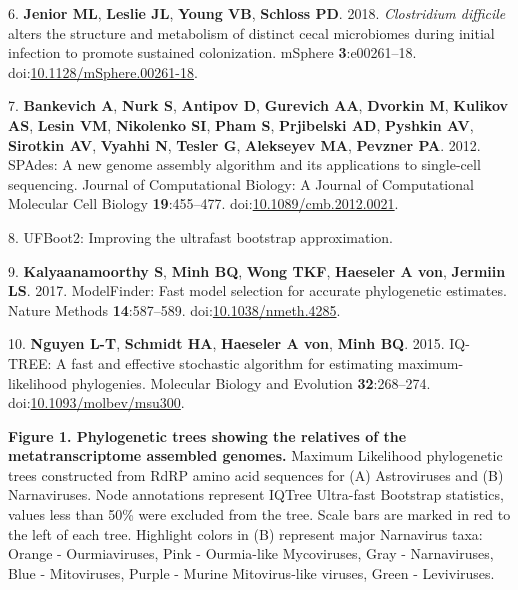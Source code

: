 \documentclass[11pt,]{article}
\begin{document}
\leavevmode\hypertarget{ref-jenior_clostridium_2018}{}%
6. \textbf{Jenior ML}, \textbf{Leslie JL}, \textbf{Young VB},
\textbf{Schloss PD}. 2018. \emph{Clostridium difficile} alters the
structure and metabolism of distinct cecal microbiomes during initial
infection to promote sustained colonization. mSphere
\textbf{3}:e00261--18.
doi:\href{https://doi.org/10.1128/mSphere.00261-18}{10.1128/mSphere.00261-18}.

\leavevmode\hypertarget{ref-bankevich_spades:_2012}{}%
7. \textbf{Bankevich A}, \textbf{Nurk S}, \textbf{Antipov D},
\textbf{Gurevich AA}, \textbf{Dvorkin M}, \textbf{Kulikov AS},
\textbf{Lesin VM}, \textbf{Nikolenko SI}, \textbf{Pham S},
\textbf{Prjibelski AD}, \textbf{Pyshkin AV}, \textbf{Sirotkin AV},
\textbf{Vyahhi N}, \textbf{Tesler G}, \textbf{Alekseyev MA},
\textbf{Pevzner PA}. 2012. SPAdes: A new genome assembly algorithm and
its applications to single-cell sequencing. Journal of Computational
Biology: A Journal of Computational Molecular Cell Biology
\textbf{19}:455--477.
doi:\href{https://doi.org/10.1089/cmb.2012.0021}{10.1089/cmb.2012.0021}.

\leavevmode\hypertarget{ref-hoang_ufboot2:_2018}{}%
8. UFBoot2: Improving the ultrafast bootstrap approximation.

\leavevmode\hypertarget{ref-kalyaanamoorthy_modelfinder:_2017}{}%
9. \textbf{Kalyaanamoorthy S}, \textbf{Minh BQ}, \textbf{Wong TKF},
\textbf{Haeseler A von}, \textbf{Jermiin LS}. 2017. ModelFinder: Fast
model selection for accurate phylogenetic estimates. Nature Methods
\textbf{14}:587--589.
doi:\href{https://doi.org/10.1038/nmeth.4285}{10.1038/nmeth.4285}.

\leavevmode\hypertarget{ref-nguyen_iq-tree:_2015}{}%
10. \textbf{Nguyen L-T}, \textbf{Schmidt HA}, \textbf{Haeseler A von},
\textbf{Minh BQ}. 2015. IQ-TREE: A fast and effective stochastic
algorithm for estimating maximum-likelihood phylogenies. Molecular
Biology and Evolution \textbf{32}:268--274.
doi:\href{https://doi.org/10.1093/molbev/msu300}{10.1093/molbev/msu300}.

\newpage

\textbf{Figure 1. Phylogenetic trees showing the relatives of the
metatranscriptome assembled genomes.} Maximum Likelihood phylogenetic
trees constructed from RdRP amino acid sequences for (A) Astroviruses
and (B) Narnaviruses. Node annotations represent IQTree Ultra-fast
Bootstrap statistics, values less than 50\% were excluded from the tree.
Scale bars are marked in red to the left of each tree. Highlight colors
in (B) represent major Narnavirus taxa: Orange - Ourmiaviruses, Pink -
Ourmia-like Mycoviruses, Gray - Narnaviruses, Blue - Mitoviruses, Purple
- Murine Mitovirus-like viruses, Green - Leviviruses.
\end{document}
